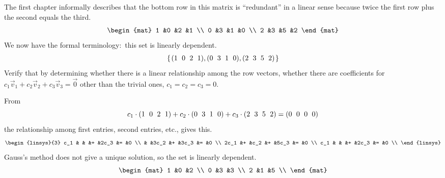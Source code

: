 \documentclass[noanswers, nolegalese, 11pt]{examjh}
\begin{document}
\thispagestyle{empty}
\vspace{-1ex}
\makebox[\textwidth]{\hbox{}\hrulefill\hbox{}}


\begin{questions}
\question
The first chapter informally describes that the
bottom row in this matrix is ``redundant'' in a linear sense because
twice the first row plus the second equals the third.
\begin{equation*}
\begin{mat}
  1  &0  &2  &1  \\
  0  &3  &1  &0  \\
  2  &3  &5  &2
\end{mat}
\end{equation*}
We now have the formal terminology:~this set
is linearly dependent.
\begin{equation*}
  \set{
       \rowvec{1 & 0 & 2 & 1},
       \rowvec{0 & 3 & 1 & 0},
       \rowvec{2 & 3 & 5 & 2}
      }
\end{equation*}
Verify that by 
determining whether there is a linear relationship among the row vectors, 
whether there are coefficients for 
$c_1\vec{v}_1+c_2\vec{v}_2+c_3\vec{v}_3=\vec{0}$
other than the trivial ones, $c_1=c_2=c_3=0$.
\begin{solution}
From 
\begin{equation*}
       c_1\cdot\rowvec{1 & 0 & 2 & 1}
       +c_2\cdot\rowvec{0 & 3 & 1 & 0}
       +c_3\cdot\rowvec{2 & 3 & 5 & 2}
       =\rowvec{0 &0 &0 &0}
\end{equation*}
the relationship among first entries, second entries, etc., gives this. 
\begin{equation*}
\begin{linsys}{3}
  c_1  &  &      &+  &2c_3  &= &0 \\
       &  &3c_2  &+  &3c_3  &= &0 \\
 2c_1  &+ &c_2   &+  &5c_3  &= &0 \\
  c_1  &  &      &+  &2c_3  &= &0 \\
\end{linsys}
\end{equation*}
Gauss's method does not give a unique solution, so the set is linearly
dependent.
\begin{equation*}
  \begin{mat}
  1  &0  &2  \\ 
  0  &3  &3  \\ 
  2  &1  &5  \\ 

\end{mat}
\end{equation*}
\end{solution}
\end{questions}
\end{document}
